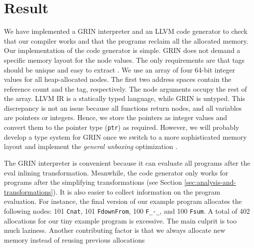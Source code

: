 \documentclass[10pt, twocolumn]{article}
\begin{document}
\section{Result}
We have implemented a GRIN interpreter and an LLVM code generator to check that our compiler works and that the programs reclaim all the allocated memory. 
Our implementation of the code generator is simple. 
GRIN does not demand a specific memory layout for the node values.
The only requirements are that tags should be unique and easy to extract \citep{boquist1999}.
We use an array of four 64-bit integer values for all heap-allocated nodes. 
The first two address spaces contain the reference count and the tag, respectively.
The node arguments occupy the rest of the array.
LLVM IR is a statically typed language, while GRIN is untyped.
This discrepancy is not an issue because all functions return nodes, and all variables are pointers or integers.
Hence, we store the pointers as integer values and convert them to the pointer type (\lstinline{ptr}) as required.
However, we will probably develop a type system for GRIN once we switch to a more sophisticated memory layout and implement the \emph{general unboxing} optimization \citep{boquist1999}.

The GRIN interpreter is convenient because it can evaluate all programs after the eval inlining transformation. 
Meanwhile, the code generator only works for programs after the simplifying transformations (see Section \ref{sec:analysis-and-transformations}).
It is also easier to collect information on the program evaluation.
For instance, the final version of our example program allocates the following nodes: 101 \lstinline{Cnat}, 101 \lstinline{FdownFrom}, 100 \lstinline{F_-_},  and 100 \lstinline{Fsum}.
A total of 402 allocations for our tiny example program is excessive. 
The main culprit is too much laziness. 
Another contributing factor is that we always allocate new memory instead of reusing previous allocations



\end{document}
